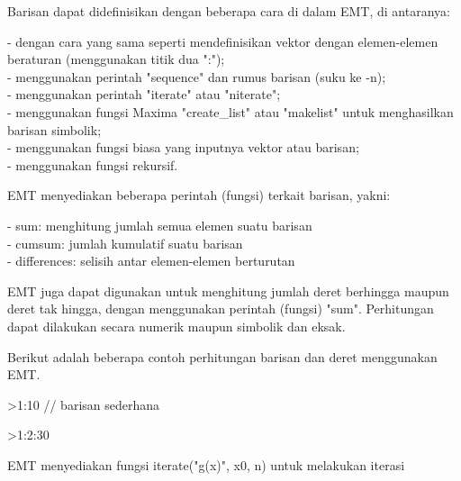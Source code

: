 \documentclass[a4paper,10pt]{article}
\begin{document}
\begin{eulernotebook}
\begin{eulercomment}
\begin{eulercomment}
\begin{eulercomment}
\begin{eulercomment}
\begin{eulercomment}
Barisan dapat didefinisikan dengan beberapa cara di dalam EMT, di antaranya:

- dengan cara yang sama seperti mendefinisikan vektor dengan elemen-elemen beraturan
(menggunakan titik dua ":");\\
- menggunakan perintah "sequence" dan rumus barisan (suku ke -n);\\
- menggunakan perintah "iterate" atau "niterate";\\
- menggunakan fungsi Maxima "create\_list" atau "makelist" untuk menghasilkan barisan
simbolik;\\
- menggunakan fungsi biasa yang inputnya vektor atau barisan;\\
- menggunakan fungsi rekursif.

EMT menyediakan beberapa perintah (fungsi) terkait barisan, yakni:

- sum: menghitung jumlah semua elemen suatu barisan\\
- cumsum: jumlah kumulatif suatu barisan\\
- differences: selisih antar elemen-elemen berturutan

EMT juga dapat digunakan untuk menghitung jumlah deret berhingga maupun deret tak hingga,
dengan menggunakan perintah (fungsi) "sum". Perhitungan dapat dilakukan secara numerik
maupun simbolik dan eksak.

Berikut adalah beberapa contoh perhitungan barisan dan deret menggunakan EMT.
\end{eulercomment}
\begin{eulerprompt}
>1:10 // barisan sederhana
\end{eulerprompt}
\begin{euleroutput}
  [1,  2,  3,  4,  5,  6,  7,  8,  9,  10]
\end{euleroutput}
\begin{eulerprompt}
>1:2:30
\end{eulerprompt}
\begin{euleroutput}
  [1,  3,  5,  7,  9,  11,  13,  15,  17,  19,  21,  23,  25,  27,  29]
\end{euleroutput}
\begin{eulercomment}
EMT menyediakan fungsi iterate("g(x)", x0, n) untuk melakukan iterasi


\end{eulercomment}
\end{eulercomment}
\end{eulercomment}
\end{eulercomment}
\end{eulercomment}
\end{eulernotebook}
\end{document}

